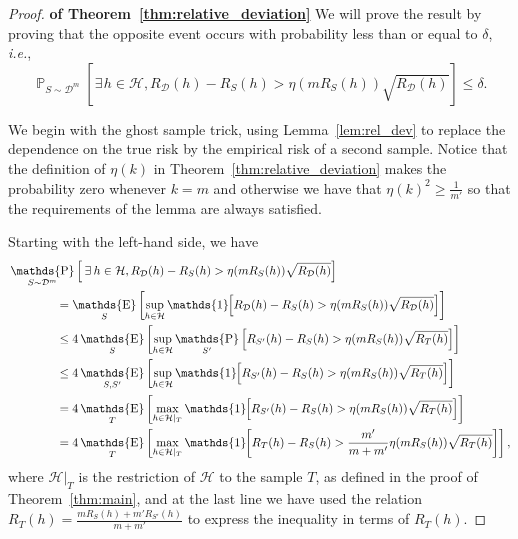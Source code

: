 \documentclass[twoside,11pt]{article}
\newcommand{\ie}{\emph{i.e.\xspace}}
\newcommand{\Id}[1]{\mathds{1}\hspace{-2.5pt}\left[#1\right]}
\let\oldexists=\exists
\renewcommand{\exists}{\hspace{1pt}\oldexists\hspace{1pt}}
\newcommand{\D}{\mathcal{D}}
\renewcommand{\H}{{\mathcal{H}}}
\DeclareMathOperator*{\Prob}{\mathds{P}}
\newcommand{\prob}[2]{\Prob_{#1}\left[#2\right]}
\DeclareMathOperator*{\Expectation}{\mathds{E}}
\newcommand{\exv}[2]{\Expectation_{#1}\left[#2\right]}
\begin{document}
\begin{proof}\hspace{0pt}\textbf{of Theorem~\ref{thm:relative_deviation}}
We will prove the result by proving that the opposite event occurs with probability less than or equal to $\delta$, \ie,
\begin{equation*}
\prob{S\sim\D^m}{\exists h \in \H, R_\D(h) - R_S(h) > \eta(m R_S(h)) \sqrt{R_\D(h)}} \leq \delta.
\end{equation*}

We begin with the ghost sample trick, using Lemma~\ref{lem:rel_dev} to replace the dependence on the true risk by the empirical risk of a second sample.
Notice that the definition of $\eta(k)$ in Theorem~\ref{thm:relative_deviation} makes the probability zero whenever $k=m$ and otherwise we have that $\eta(k)^2 \geq \frac{1}{m'}$ so that the requirements of the lemma are always satisfied.

Starting with the left-hand side, we have
\begin{align*}
&\prob{S\sim\D^m}{\exists h \in \H, R_\D(h) - R_S(h) > \eta(m R_S(h)) \sqrt{R_\D(h)}}\\
    &\hspace{40pt} = \exv{S}{\sup_{h\in\H} \Id{ R_\D(h) - R_S(h) > \eta(m R_S(h)) \sqrt{R_\D(h)} }}\\
    &\hspace{40pt} \le 4 \exv{S}{\sup_{h\in\H} \prob{S'}{R_{S'}(h) - R_S(h) > \eta(m R_S(h)) \sqrt{R_T(h)}} }\\
    &\hspace{40pt} \le 4 \exv{S, S'}{\sup_{h\in\H} \Id{R_{S'}(h) - R_S(h) > \eta(m R_S(h)) \sqrt{R_T(h)}} }\\
    &\hspace{40pt} = 4 \exv{T}{\max_{h\in\H|_T} \Id{R_{S'}(h) - R_S(h) > \eta(m R_S(h)) \sqrt{R_T(h)}} }\\
    &\hspace{40pt} = 4 \exv{T}{\max_{h\in\H|_T} \Id{R_{T}(h) - R_S(h) > \frac{m'}{m+m'} \eta(m R_S(h)) \sqrt{R_T(h)}} },
\end{align*}
where $\H|_T$ is the restriction of $\H$ to the sample $T$, as defined in the proof of Theorem~\ref{thm:main}, and at the last line we have used the relation $R_T(h) = \frac{m R_S(h) + m' R_{S'}(h)}{m+m'}$ to express the inequality in terms of $R_T(h)$.


\end{proof}
\end{document}
